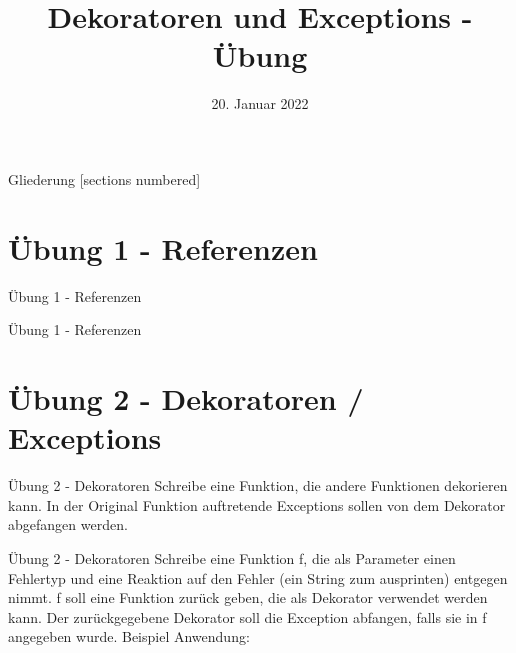 



\title{Dekoratoren und Exceptions - Übung}
\date{20. Januar 2022}


\maketitle

\begin{frame}{Gliederung}
	[sections numbered]
	\tableofcontents
\end{frame}


\section{Übung 1 - Referenzen}
\begin{frame}{Übung 1 - Referenzen}
	
\end{frame}

\begin{frame}{Übung 1 - Referenzen}
	
\end{frame}

\section{Übung 2 - Dekoratoren / Exceptions}
\begin{frame}{Übung 2 - Dekoratoren}
	Schreibe eine Funktion, die andere Funktionen dekorieren kann. In der Original Funktion auftretende Exceptions sollen von dem Dekorator abgefangen werden.	
\end{frame}

\begin{frame}{Übung 2 - Dekoratoren}
	Schreibe eine Funktion \alert{f}, die als Parameter einen Fehlertyp und eine Reaktion auf den Fehler (ein String zum ausprinten) entgegen nimmt. f soll eine Funktion zurück geben, die als Dekorator verwendet werden kann. Der zurückgegebene Dekorator soll die Exception abfangen, falls sie in f angegeben wurde.
	\linebreak\linebreak
	Beispiel Anwendung:
	
\end{frame}


